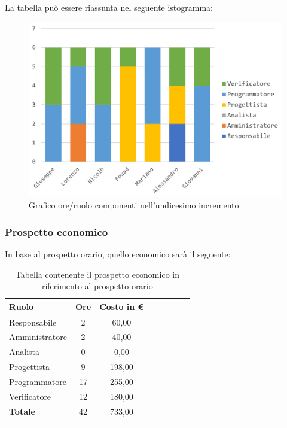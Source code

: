 		La tabella può essere riassunta nel seguente istogramma:
		\begin{figure}[H]
			\centering
			\includegraphics[width=0.8\linewidth]{./images/preventivo/incremento11-1.png}
			\caption{Grafico ore/ruolo componenti nell'undicesimo incremento}
			\label{fig:grafico suddivione ruoli incremento XI}
		\end{figure}
		
		\subsubsection{Prospetto economico}
		In base al prospetto orario, quello economico sarà il seguente: 
		
		\begin{longtable}{|l|c|c|c|c|c|c|c|}
			\hline
			\rowcolor{lighter-grayer}
			\textbf{Ruolo} & \textbf{Ore} & \textbf{Costo in € } \\
			\hline
			\endfirsthead
			
			\hline
			Responsabile 	    & 2 & 60,00\\
			\hline 
			\hline
			Amministratore	   & 2 & 40,00\\
			\hline
			\hline
			Analista 				& 0 & 0,00\\
			\hline
			\hline
			Progettista 		   & 9 & 198,00\\
			\hline
			\hline
			Programmatore 	  & 17 & 255,00\\
			\hline
			\hline
			Verificatore 		   & 12 & 180,00\\
			\hline
			\textbf{Totale} 	 & 42 & 733,00\\
			\hline
			\caption{Tabella contenente il prospetto economico in riferimento al prospetto orario}
		\end{longtable}
		\pagebreak
		
